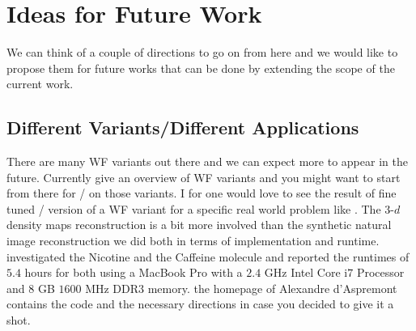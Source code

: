 



\section*{Ideas for Future Work}\label{sec:ideas_for_future_work}

We can think of a couple of directions to go on from here and we would like to propose them 
for future works that can be done by extending the scope of the current work.

\subsection*{Different Variants/Different Applications}

There are many \ac{WF}\cite{Jaganathan2015}\cite{Liu2019} variants out there and we can expect more to appear in the future. 
Currently \cite{Jaganathan2015}\cite{Liu2019}\cite{Chandra2017} give an overview of \ac{WF} variants and you might want to start from there for 
\du/\au\cite{Monga2019} on those variants. I for one would love to see the result of fine tuned 
\du/\au\cite{Monga2019} version of a \ac{WF} variant for a specific real world problem like \cite{Fogel2013}. The $3$-$d$ density maps reconstruction 
is a bit more involved than the synthetic natural image reconstruction we did both in terms of implementation and runtime. \cite{Candes2014} investigated the 
Nicotine and the Caffeine molecule and reported the runtimes of 
$5.4$ hours for both using a MacBook Pro with a $2.4$ GHz Intel Core i$7$ Processor and $8$ GB $1600$ MHz DDR$3$ memory. 
the homepage of Alexandre d'Aspremont contains the code and the necessary directions in case you decided to give it a shot.

